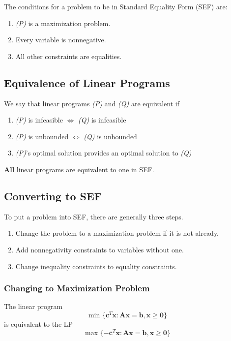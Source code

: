 The conditions for a problem to be in Standard Equality Form (SEF) are:
\begin{enumerate}
    \item \begin{center} \emph{(P)} is a maximization problem. \end{center}
    \item \begin{center} Every variable is nonnegative. \end{center}
    \item \begin{center} All other constraints are equalities. \end{center}
\end{enumerate}


\subsection{Equivalence of Linear Programs}

We say that linear programs \emph{(P)} and \emph{(Q)} are equivalent if
\begin{enumerate}
    \item \emph{(P)} is infeasible $\iff$ \emph{(Q)} is infeasible 
    \item \emph{(P)} is unbounded $\iff$ \emph{(Q)} is unbounded 
    \item \emph{(P)}'s optimal solution provides an optimal solution to \emph{(Q)} 
\end{enumerate}
\textbf{All} linear programs are equivalent to one in SEF.


\subsection{Converting to SEF}
To put a problem into SEF, there are generally three steps.
\begin{enumerate}
    \item Change the problem to a maximization problem if it is not already.
    \item Add nonnegativity constraints to variables without one.
    \item Change inequality constraints to equality constraints.
\end{enumerate}

\subsubsection{Changing to Maximization Problem}
The linear program 
\begin{equation*}
    \text{min } \{\mathbf{c}^T\mathbf{x} : \mathbf{Ax} = \mathbf{b}, \mathbf{x} \geq \mathbf{0} \}
\end{equation*}
is equivalent to the LP
\begin{equation*}
    \text{max } \{-\mathbf{c}^T\mathbf{x} : \mathbf{Ax} = \mathbf{b}, \mathbf{x} \geq \mathbf{0} \}
\end{equation*}

